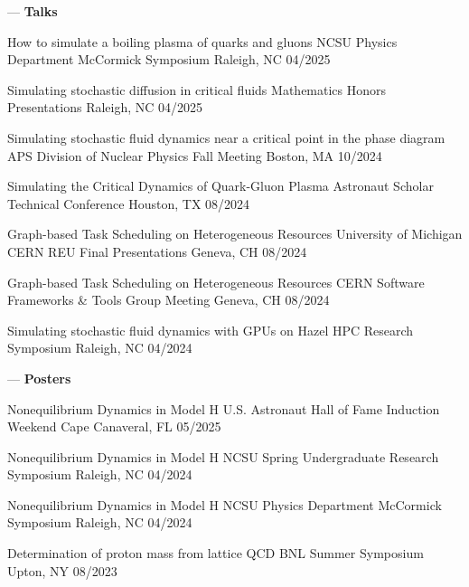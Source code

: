{\large--- {\bfseries Talks}}
\vspace{0.3em}

\presentation
{How to simulate a boiling plasma of quarks and gluons}
{NCSU Physics Department McCormick Symposium}
{Raleigh, NC} {04/2025}

\presentation
{Simulating stochastic diffusion in critical fluids}
{Mathematics Honors Presentations}
{Raleigh, NC} {04/2025}

\presentation
{Simulating stochastic fluid dynamics near a critical point in the phase diagram}
{APS Division of Nuclear Physics Fall Meeting}
{Boston, MA} {10/2024}

\presentation
{Simulating the Critical Dynamics of Quark-Gluon Plasma}
{Astronaut Scholar Technical Conference}
{Houston, TX} {08/2024}

\presentation
{Graph-based Task Scheduling on Heterogeneous Resources}
{University of Michigan CERN REU Final Presentations}
{Geneva, CH} {08/2024}

\presentation
{Graph-based Task Scheduling on Heterogeneous Resources}
{CERN Software Frameworks \& Tools Group Meeting}
{Geneva, CH} {08/2024}

\presentation
{Simulating stochastic fluid dynamics with GPUs on Hazel}
{HPC Research Symposium}
{Raleigh, NC} {04/2024}

{\large--- {\bfseries Posters}}
\vspace{0.3em}

\presentation
{Nonequilibrium Dynamics in Model H}
{U.S. Astronaut Hall of Fame Induction Weekend}
{Cape Canaveral, FL} {05/2025}

\presentation
{Nonequilibrium Dynamics in Model H}
{NCSU Spring Undergraduate Research Symposium}
{Raleigh, NC} {04/2024}

\presentation
{Nonequilibrium Dynamics in Model H}
{NCSU Physics Department McCormick Symposium}
{Raleigh, NC} {04/2024}

\presentation
{Determination of proton mass from lattice QCD}
{BNL Summer Symposium}
{Upton, NY} {08/2023}
